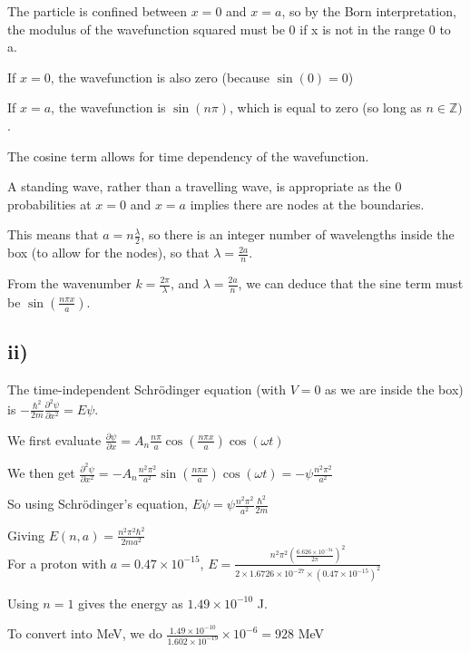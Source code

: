 \documentclass{article}
\begin{document}
The particle is confined between $x =0 $ and $x = a$, so by the Born interpretation, the modulus of the wavefunction squared must be 0 if x is not in the range 0 to a. 

If $x=0$, the wavefunction is also zero (because $\sin{(0)}=0$)

If $x=a$, the wavefunction is $\sin{(n\pi)}$, which is equal to zero (so long as $n \in \mathbb{Z})$.

The cosine term allows for time dependency of the wavefunction.

A standing wave, rather than a travelling wave, is appropriate as the 0 probabilities at $x=0$ and $x=a$ implies there are nodes at the boundaries.

This means that $a = n\frac{\lambda}{2}$, so there is an integer number of wavelengths inside the box (to allow for the nodes), so that $\lambda = \frac{2a}{n}$. 

From the wavenumber $k = \frac{2\pi}{\lambda}$, and $\lambda = \frac{2a}{n}$, we can deduce that the sine term must be $\sin({\frac{n\pi x}{a}})$.


\subsection*{ii)}

The time-independent Schrödinger equation (with $V=0$ as we are inside the box) is $
-\frac{\hbar^2}{2m}\frac{\partial^2 \psi}{\partial x^2} = E\psi$.

We first evaluate $\frac{\partial \psi}{\partial x} = A_n\frac{n\pi}{a}\cos(\frac{{n\pi x}}{a})\cos({\omega t})$

We then get $\frac{\partial^2 \psi}{\partial x^2} = -A_n\frac{n^2\pi^2}{a^2}\sin(\frac{{n\pi x}}{a})\cos({\omega t}) = -\psi \frac{n^2\pi^2}{a^2}$

So using Schrödinger's equation, $E\psi = \psi \frac{n^2\pi^2}{a^2}\frac{\hbar^2}{2m}$

Giving $E (n, a) = \frac{n^2\pi^2 \hbar^2}{2ma^2}$
\\

For a proton with $a = 0.47 \times 10^{-15}$, $E = \frac{n^2 \pi^2 (\frac{6.626\times10^{-34}}{2\pi})^2}{2 \times 1.6726 \times 10^{-27} \times (0.47\times10^{-15}) ^2}$

Using $n=1$ gives the energy as $1.49 \times 10^{-10}$ J.
 
To convert into MeV, we do $\frac{1.49 \times 10^{-10}}{1.602\times10^{-19}} \times 10^{-6} = 928$ MeV
\end{document}
